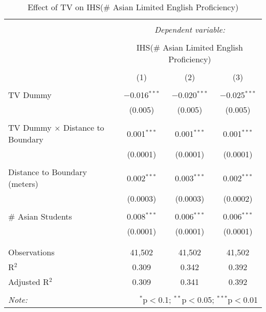 
\begin{table}[!htbp] \centering 
  \caption{Effect of TV on IHS(\# Asian Limited English Proficiency)} 
  \label{} 
\begin{tabular}{@{\extracolsep{-2pt}}lccc} 
\\[-1.8ex]\hline 
\hline \\[-1.8ex] 
 & \multicolumn{3}{c}{\textit{Dependent variable:}} \\ 
\cline{2-4} 
\\[-1.8ex] & \multicolumn{3}{c}{IHS(\# Asian Limited English Proficiency)} \\ 
\\[-1.8ex] & (1) & (2) & (3)\\ 
\hline \\[-1.8ex] 
 TV Dummy & $-$0.016$^{***}$ & $-$0.020$^{***}$ & $-$0.025$^{***}$ \\ 
  & (0.005) & (0.005) & (0.005) \\ 
  & & & \\ 
 TV Dummy $\times$ Distance to Boundary & 0.001$^{***}$ & 0.001$^{***}$ & 0.001$^{***}$ \\ 
  & (0.0001) & (0.0001) & (0.0001) \\ 
  & & & \\ 
 Distance to Boundary (meters) & 0.002$^{***}$ & 0.003$^{***}$ & 0.002$^{***}$ \\ 
  & (0.0003) & (0.0003) & (0.0002) \\ 
  & & & \\ 
 \# Asian Students & 0.008$^{***}$ & 0.006$^{***}$ & 0.006$^{***}$ \\ 
  & (0.0001) & (0.0001) & (0.0001) \\ 
  & & & \\ 
\hline \\[-1.8ex] 
Observations & 41,502 & 41,502 & 41,502 \\ 
R$^{2}$ & 0.309 & 0.342 & 0.392 \\ 
Adjusted R$^{2}$ & 0.309 & 0.341 & 0.392 \\ 
\hline 
\hline \\[-1.8ex] 
\textit{Note:}  & \multicolumn{3}{r}{$^{*}$p$<$0.1; $^{**}$p$<$0.05; $^{***}$p$<$0.01} \\ 
\end{tabular} 
\end{table} 
